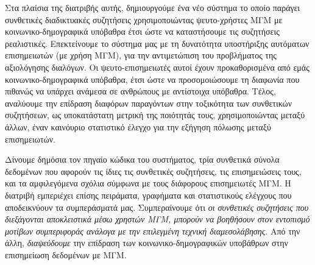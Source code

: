 Στα πλαίσια της διατριβής αυτής, δημιουργούμε ένα νέο σύστημα το οποίο παράγει συνθετικές διαδικτυακές συζητήσεις χρησιμοποιώντας ψευτο-χρήστες ΜΓΜ με κοινωνικο-δημογραφικά υπόβαθρα έτσι ώστε να καταστήσουμε τις συζητήσεις ρεαλιστικές. Επεκτείνουμε το σύστημα μας με τη δυνατότητα υποστήριξης αυτόματων επισημειωτών (με χρήση ΜΓΜ), για την αντιμετώπιση του προβλήματος της αξιολόγησης διαλόγων. Οι ψευτο-επισημειωτές αυτοί έχουν προκαθορισμένα από εμάς κοινωνικο-δημογραφικά υπόβαθρα, έτσι ώστε να προσομοιώσουμε τη διαφωνία που πιθανώς να υπάρχει ανάμεσα σε ανθρώπους με αντίστοιχα υπόβαθρα. Τέλος, αναλύουμε την επίδραση διαφόρων παραγόντων στην τοξικότητα των συνθετικών συζητήσεων, ως υποκατάστατη μετρική της ποιότητάς τους, χρησιμοποιώντας μεταξύ άλλων, έναν καινόυριο στατιστικό έλεγχο για την εξήγηση πόλωσης μεταξύ επισημειωτών. 

Δίνουμε δημόσια τον πηγαίο κώδικα του συστήματος, τρία συνθετικά σύνολα δεδομένων που αφορούν τις ίδιες τις συνθετικές συζητήσεις, τις επισημειώσεις τους, και τα αμφιλεγόμενα σχόλια σύμφωνα με τους διάφορους επισημειωτές ΜΓΜ. Η διατριβή εμπεριέχει επίσης πειράματα, γραφήματα και στατιστικούς ελέγχους που αποδεικνύουν τα συμπεράσματά μας. Συμπεραίνουμε ότι \textit{οι συνθετικές συζητήσεις που διεξάγονται αποκλειστικά μέσω χρηστών ΜΓΜ, μπορούν να βοηθήσουν στον εντοπισμό μοτίβων συμπεριφοράς ανάλογα με την επιλεγμένη τεχνική διαμεσολάβησης}. Από την άλλη, \textit{διαψεύδουμε} την επίδραση των κοινωνικο-δημογραφικών υποβάθρων στην επισημείωση δεδομένων με ΜΓΜ.


